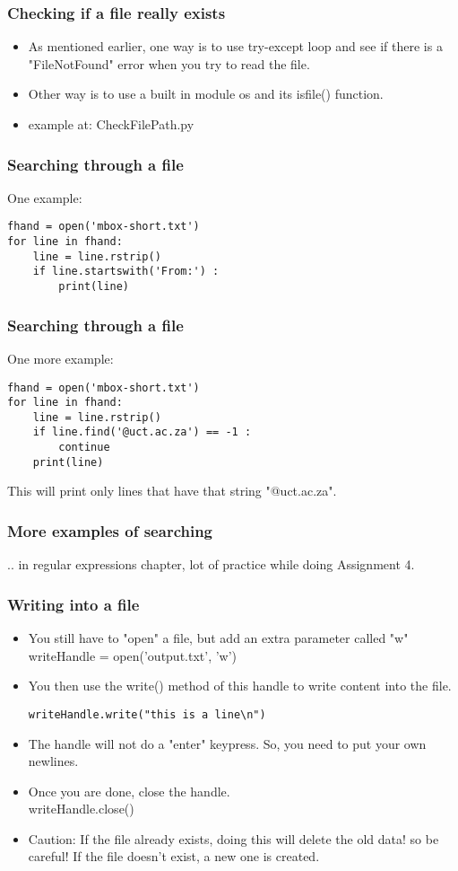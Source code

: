 \documentclass{beamer}
\begin{document}
\begin{frame}[fragile]
\frametitle{Checking if a file really exists}
\begin{itemize}
\item As mentioned earlier, one way is to use try-except loop and see if there is a "FileNotFound" error when you try to read the file. 
\item Other way is to use a built in module os and its isfile() function.
\item example at: CheckFilePath.py 
\end{itemize}
\end{frame}

\begin{frame}[fragile]
\frametitle{Searching through a file}
One example: 
\begin{verbatim}
fhand = open('mbox-short.txt')
for line in fhand:
    line = line.rstrip()
    if line.startswith('From:') :
        print(line)
\end{verbatim}
\end{frame}

\begin{frame}[fragile]
\frametitle{Searching through a file}
One more example:
\begin{verbatim}
fhand = open('mbox-short.txt')
for line in fhand:
    line = line.rstrip()
    if line.find('@uct.ac.za') == -1 : 
        continue
    print(line)
\end{verbatim}
\pause This will print only lines that have that string "@uct.ac.za".
\end{frame}

\begin{frame}
\frametitle{More examples of searching}
.. in regular expressions chapter, lot of practice while doing Assignment 4. 
\end{frame}

\begin{frame}[fragile]
\frametitle{Writing into a file}
\begin{itemize}
\item You still have to "open" a file, but add an extra parameter called "w"
\\ writeHandle = open('output.txt', 'w')
\item You then use the write() method of this handle to write content into the file.
\begin{verbatim}
writeHandle.write("this is a line\n")
\end{verbatim}
\item The handle will not do a "enter" keypress. So, you need to put your own newlines.
\item Once you are done, close the handle. \\ writeHandle.close()
\item Caution: If the file already exists, doing this will delete the old data! so be careful! If the file doesn’t exist, a new one is created.
\end{itemize}
\end{frame}
\end{document}
